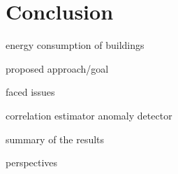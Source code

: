 
\section{Conclusion}
energy consumption of buildings

proposed approach/goal

faced issues

correlation estimator
anomaly detector

summary of the results

perspectives



